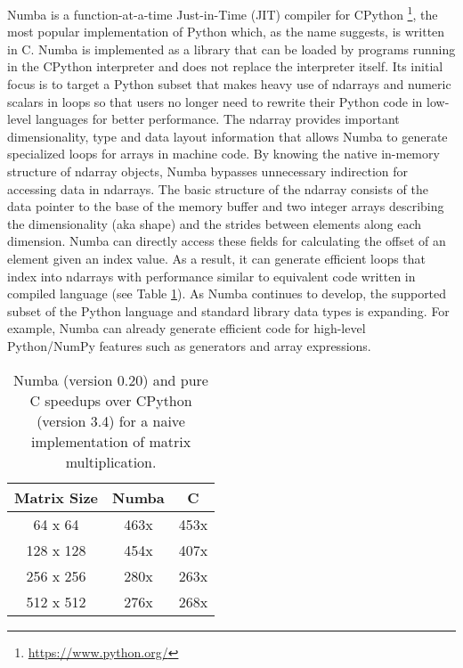 \documentclass{sig-alternate}
\begin{document}
Numba is a function-at-a-time Just-in-Time (JIT) compiler for CPython
\footnote{\url{https://www.python.org/}}, the most popular
implementation of Python which, as the name suggests, is written in C.
Numba is implemented as a library that can be loaded by programs
running in the CPython interpreter and does not replace the interpreter
itself.  Its initial focus is to target a Python subset that makes
heavy use of ndarrays and numeric scalars in loops so that users no
longer need to rewrite their Python code in low-level languages for
better performance.  The ndarray provides important dimensionality,
type and data layout information that allows Numba to generate
specialized loops for arrays in machine code.  By knowing the native
in-memory structure of ndarray objects, Numba bypasses unnecessary
indirection for accessing data in ndarrays.  The basic structure of
the ndarray consists of the data pointer to the base of the memory
buffer and two integer arrays describing the dimensionality (aka
shape) and the strides between elements along each dimension. Numba
can directly access these fields for calculating the offset of an
element given an index value.  As a result, it can generate efficient
loops that index into ndarrays with performance similar to equivalent
code written in compiled language (see Table \ref{table:speedup}). As
Numba continues to develop, the supported subset of the Python
language and standard library data types is expanding.  For example,
Numba can already generate efficient code for high-level Python/NumPy
features such as generators and array expressions.

\begin{table}
\centering
\caption{Numba (version 0.20) and pure C speedups over CPython (version 3.4) for a naive implementation of matrix multiplication.}
\label{table:speedup}
\begin{tabular}{|c|c|c|} \hline
\textbf{Matrix Size} & \textbf{Numba} & \textbf{C}\\ \hline
64 x 64 & 463x & 453x \\ \hline
128 x 128 & 454x & 407x \\ \hline
256 x 256 & 280x & 263x \\ \hline
512 x 512 & 276x & 268x \\ \hline
\end{tabular}
\end{table}

\end{document}

